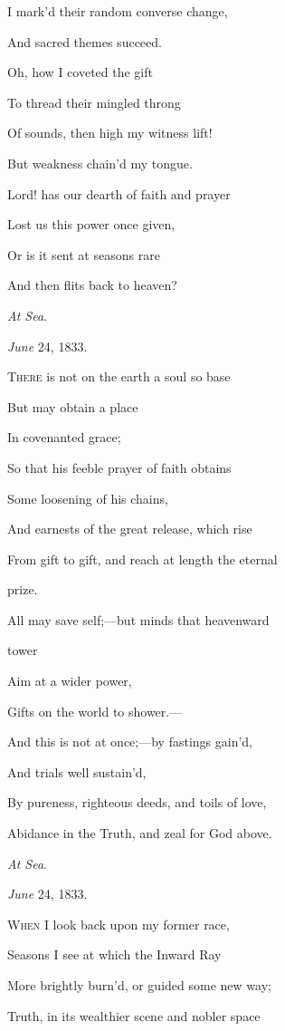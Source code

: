 I mark'd their random converse change,

And sacred themes succeed.

Oh, how I coveted the gift

To thread their mingled throng

Of sounds, then high my witness lift!

But weakness chain'd my tongue.

Lord! has our dearth of faith and prayer

Lost us this power once given,

Or is it sent at seasons rare

And then flits back to heaven?

\emph{At Sea}.

\emph{June} 24, 1833.


T\textsc{here} is not on the earth a soul so base

But may obtain a place

In
covenanted grace;

So that his feeble prayer of faith obtains

Some
loosening of his chains,

And earnests of the great release, which rise

From gift to gift, and reach at length the eternal

prize.

All may save self;—but minds that heavenward

tower

Aim
at a wider power,

Gifts on the world to shower.—

And this is not at once;—by fastings gain'd,

And
trials well sustain'd,

By pureness, righteous deeds, and toils of love,

Abidance in the Truth, and zeal for God above.

\emph{At Sea}.

\emph{June} 24, 1833.


W\textsc{hen} I look back upon my former race,

Seasons I see at which the Inward Ray

More brightly burn'd, or guided some new way;

Truth, in its wealthier scene and nobler space

